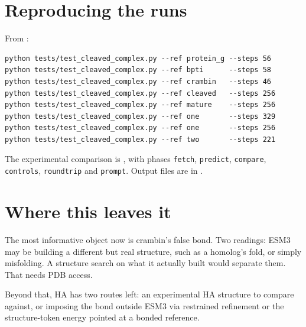 \documentclass[11pt,a4paper]{article}
\begin{document}
\section{Reproducing the runs}

From :

\begin{verbatim}
python tests/test_cleaved_complex.py --ref protein_g --steps 56
python tests/test_cleaved_complex.py --ref bpti      --steps 58
python tests/test_cleaved_complex.py --ref crambin   --steps 46
python tests/test_cleaved_complex.py --ref cleaved   --steps 256
python tests/test_cleaved_complex.py --ref mature    --steps 256
python tests/test_cleaved_complex.py --ref one       --steps 329
python tests/test_cleaved_complex.py --ref one       --steps 256
python tests/test_cleaved_complex.py --ref two       --steps 221
\end{verbatim}

The experimental comparison is , with
phases \texttt{fetch}, \texttt{predict}, \texttt{compare}, \texttt{controls},
\texttt{roundtrip} and \texttt{prompt}. Output files are in
.

\section{Where this leaves it}

The most informative object now is crambin's false bond. Two readings: ESM3 may
be building a different but real structure, such as a homolog's fold, or simply
misfolding. A structure search on what it actually built would separate them.
That needs PDB access.

Beyond that, HA has two routes left: an experimental HA structure to compare
against, or imposing the bond outside ESM3 via restrained refinement or the
structure-token energy pointed at a bonded reference.
\end{document}
